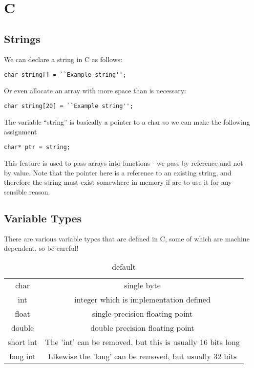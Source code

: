 \chapter{C}

\section{Strings}

We can declare a string in C as follows:

\begin{verbatim}
char string[] = ``Example string'';
\end{verbatim}
Or even allocate an array with more space than is necessary:
\begin{verbatim}
char string[20] = ``Example string'';
\end{verbatim}

The variable ``string'' is basically a pointer to a char so we can make the following assignment
\begin{verbatim}
char* ptr = string;
\end{verbatim}
This feature is used to pass arrays into functions - we pass by reference and not by value. Note that the pointer here is a reference to an existing string, and therefore the string must exist somewhere in memory if are to use it for any sensible reason. 


\section{Variable Types}

There are various variable types that are defined in C, some of which are machine dependent, so be careful!
\begin{table}[htdp]
\caption{default}
\begin{center}
\begin{tabular}{|c|c|}
\hline 
char & single byte\\
int & integer which is implementation defined\\
float & single-precision floating point\\
double & double precision floating point\\
short int & The 'int' can be removed, but this is usually 16 bits long\\
long int & Likewise the 'long' can be removed, but usually 32 bits\\
\hline
\end{tabular}
\end{center}
\label{default}
\end{table}%

